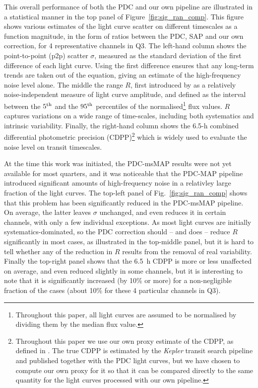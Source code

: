 \documentclass[useAMS,usenatbib]{mn2e}
\begin{document}
This overall performance of both the PDC and our own pipeline are illustrated in a statistical manner in the top panel of Figure~\ref{fig:sig_ran_comp}. This figure shows various estimates of the light curve scatter on different timescales as a function magnitude, in the form of ratios between the PDC, SAP and our own correction, for 4 representative channels in Q3. The left-hand column shows the point-to-point (p2p) scatter $\sigma$, measured as the standard deviation of
the first difference of each light curve. Using the first difference ensures that any
long-term trends are taken out of the equation, giving an estimate of the high-frequency noise level alone. The middle the range $R$, first introduced by \citet{bas+10a,bas+10b} as a relatively noise-independent measure of light curve amplitude, and defined as the interval
between the $5^{\rm th}$ and the $95^{\rm th}$ percentiles of the
normalised\footnote{Throughout this paper, all
light curves are assumed to be normalised by dividing them by the
median flux value.} flux values. $R$ captures variations on a wide range of
time-scales, including both systematics and intrinsic
variability. Finally, the right-hand column shows the 6.5-h combined differential photometric precision (CDPP)\footnote{Throughout this paper we use our own proxy estimate of the CDPP, as defined in \citep{aig+16}. The true CDPP is estimated by the \emph{Kepler} transit search pipeline and published together with the PDC light curves, but we have chosen to compute our own proxy for it so that it can be compared directly to the same quantity for the light curves processed with our own pipeline.} which is widely used to evaluate the noise level on transit timescales. 

At the time this work was initiated, the PDC-msMAP results were not yet available for most quarters, and it was noticeable that the PDC-MAP pipeline introduced significant amounts of high-frequency noise in a relativley large fraction of the light curves. The top-left panel of Fig.~\ref{fig:sig_ran_comp} shows that this problem has been significantly reduced in the PDC-msMAP pipeline. On average, the latter leaves
$\sigma$ unchanged, and even reduces it in certain
channels, with only a few individual exceptions. As most light curves are initially systematics-dominated, so
the PDC correction should -- and does -- reduce $R$ significantly
in most cases, as illustrated in the top-middle panel, but it is hard to tell whether any of the reduction in $R$ results from the removal of real variability. Finally the top-right panel shows that the 6.5~h CDPP is more or less unaffected on average, and even reduced slightly in some channels, but it is interesting to note that it is significantly increased (by 10\% or more) for a non-negligible fraction of the cases (about 10\% for these 4 particular channels in Q3). 
\end{document}
